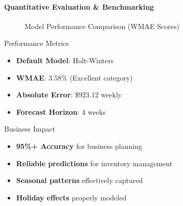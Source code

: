 %
%
%




{ 
	\framesubtitle{Quantitative Evaluation \& Benchmarking}
	
	\begin{figure}
		\centering
		
		\caption{Model Performance Comparison (WMAE Scores)}
	\end{figure}
	
	\vspace{0.5cm}
	
	\begin{block}{Performance Metrics}
		\begin{itemize}
			\item \textbf{Default Model}: Holt-Winters
			\item \textbf{WMAE}: 3.58\% (Excellent category)
			\item \textbf{Absolute Error}: \$923.12 weekly
			\item \textbf{Forecast Horizon}: 4 weeks
		\end{itemize}
	\end{block}
	
	\begin{alertblock}{Business Impact}
		\begin{itemize}
			\item \textbf{95\%+ Accuracy} for business planning
			\item \textbf{Reliable predictions} for inventory management
			\item \textbf{Seasonal patterns} effectively captured
			\item \textbf{Holiday effects} properly modeled
		\end{itemize}
	\end{alertblock}
}


